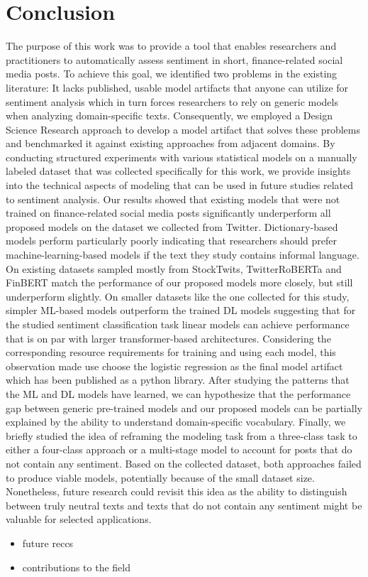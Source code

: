 \section{Conclusion}
The purpose of this work was to provide a tool that enables researchers and practitioners to automatically assess sentiment in short, finance-related social media posts. To achieve this goal, we identified two problems in the existing literature: It lacks published, usable model artifacts that anyone can utilize for sentiment analysis which in turn forces researchers to rely on generic models when analyzing domain-specific texts. Consequently, we employed a Design Science Research approach to develop a model artifact that solves these problems and benchmarked it against existing approaches from adjacent domains. By conducting structured experiments with various statistical models on a manually labeled dataset that was collected specifically for this work, we provide insights into the technical aspects of modeling that can be used in future studies related to sentiment analysis.\newline
Our results showed that existing models that were not trained on finance-related social media posts significantly underperform all proposed models on the dataset we collected from Twitter. Dictionary-based models perform particularly poorly indicating that researchers should prefer machine-learning-based models if the text they study contains informal language. On existing datasets sampled mostly from StockTwits, TwitterRoBERTa and FinBERT match the performance of our proposed models more closely, but still underperform slightly. On smaller datasets like the one collected for this study, simpler ML-based models outperform the trained DL models suggesting that for the studied sentiment classification task linear models can achieve performance that is on par with larger transformer-based architectures. Considering the corresponding resource requirements for training and using each model, this observation made use choose the logistic regression as the final model artifact which has been published as a python library. After studying the patterns that the ML and DL models have learned, we can hypothesize that the performance gap between generic pre-trained models and our proposed models can be partially explained by the ability to understand domain-specific vocabulary. Finally, we briefly studied the idea of reframing the modeling task from a three-class task to either a four-class approach or a multi-stage model to account for posts that do not contain any sentiment. Based on the collected dataset, both approaches failed to produce viable models, potentially because of the small dataset size. Nonetheless, future research could revisit this idea as the ability to distinguish between truly neutral texts and texts that do not contain any sentiment might be valuable for selected applications.

\begin{itemize}[noitemsep]
	\item future reccs
	\item contributions to the field
\end{itemize}